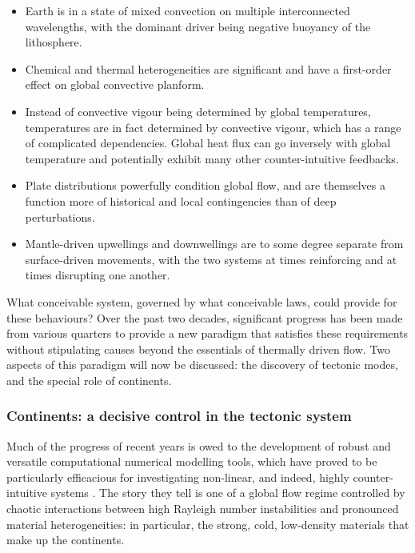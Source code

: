 \documentclass[a4paper,11pt,oneside]{book}
\begin{document}
\begin{itemize}
\item Earth is in a state of mixed convection on multiple interconnected wavelengths, with the dominant driver being negative buoyancy of the lithosphere.


\item Chemical and thermal heterogeneities are significant and have a first-order effect on global convective planform.


\item Instead of convective vigour being determined by global temperatures, temperatures are in fact determined by convective vigour, which has a range of complicated dependencies. Global heat flux can go inversely with global temperature and potentially exhibit many other counter-intuitive feedbacks.


\item Plate distributions powerfully condition global flow, and are themselves a function more of historical and local contingencies than of deep perturbations.


\item Mantle-driven upwellings and downwellings are to some degree separate from surface-driven movements, with the two systems at times reinforcing and at times disrupting one another.
\end{itemize}

What conceivable system, governed by what conceivable laws, could provide for these behaviours? Over the past two decades, significant progress has been made from various quarters to provide a new paradigm that satisfies these requirements without stipulating causes beyond the essentials of thermally driven flow. Two aspects of this paradigm will now be discussed: the discovery of tectonic modes, and the special role of continents.

\subsubsection{Continents: a decisive control in the tectonic system}

Much of the progress of recent years is owed to the development of robust and versatile computational numerical modelling tools, which have proved to be particularly efficacious for investigating non-linear, and indeed, highly counter-intuitive systems \cite{Moresi2007-dg}. The story they tell is one of a global flow regime controlled by chaotic interactions between high Rayleigh number instabilities and pronounced material heterogeneities: in particular, the strong, cold, low-density materials that make up the continents.
\end{document}
